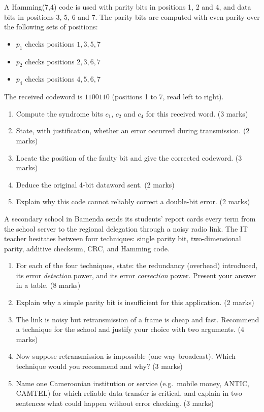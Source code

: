 \documentclass[11pt]{article}
\begin{document}
\begin{exercice}
A Hamming(7,4) code is used with parity bits in positions 1, 2 and 4, and data bits in positions 3, 5, 6 and 7. The parity bits are computed with even parity over the following sets of positions:
\begin{itemize}
\item $p_1$ checks positions $1, 3, 5, 7$
\item $p_2$ checks positions $2, 3, 6, 7$
\item $p_4$ checks positions $4, 5, 6, 7$
\end{itemize}
The received codeword is $1100110$ (positions 1 to 7, read left to right).
\begin{enumerate}
\item Compute the syndrome bits $c_1$, $c_2$ and $c_4$ for this received word. \hfill (3 marks)
\item State, with justification, whether an error occurred during transmission. \hfill (2 marks)
\item Locate the position of the faulty bit and give the corrected codeword. \hfill (3 marks)
\item Deduce the original 4-bit dataword sent. \hfill (2 marks)
\item Explain why this code cannot reliably correct a double-bit error. \hfill (2 marks)
\end{enumerate}
\end{exercice}

\begin{exercice}
A secondary school in Bamenda sends its students' report cards every term from the school server to the regional delegation through a noisy radio link. The IT teacher hesitates between four techniques: single parity bit, two-dimensional parity, additive checksum, CRC, and Hamming code.
\begin{enumerate}
\item For each of the four techniques, state: the redundancy (overhead) introduced, its error \emph{detection} power, and its error \emph{correction} power. Present your answer in a table. \hfill (8 marks)
\item Explain why a simple parity bit is insufficient for this application. \hfill (2 marks)
\item The link is noisy but retransmission of a frame is cheap and fast. Recommend a technique for the school and justify your choice with two arguments. \hfill (4 marks)
\item Now suppose retransmission is impossible (one-way broadcast). Which technique would you recommend and why? \hfill (3 marks)
\item Name one Cameroonian institution or service (e.g.\ mobile money, ANTIC, CAMTEL) for which reliable data transfer is critical, and explain in two sentences what could happen without error checking. \hfill (3 marks)
\end{enumerate}
\end{exercice}
\end{document}
